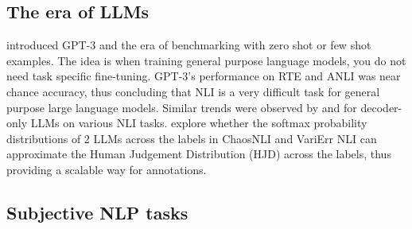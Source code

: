 \subsection{The era of LLMs}
\label{related:llms}
\citet{brown2020language} introduced GPT-3 and the era of benchmarking with zero shot or few shot examples. The idea is when training general purpose language models, you do not need task specific fine-tuning. GPT-3's performance on RTE and ANLI was near chance accuracy, thus concluding that NLI is a very difficult task for general purpose large language models. Similar trends were observed by \citet{ohmer2024form} and \citet{weber-etal-2023-mind} for decoder-only LLMs on various NLI tasks. \citet{chen2024seeingbig} explore whether the softmax probability distributions of 2 LLMs across the labels in ChaosNLI \citep{nie-etal-2020-learn} and VariErr NLI \citep{weber-genzel-etal-2024-varierr} can approximate the Human Judgement Distribution (HJD) across the labels, thus providing a scalable way for annotations.

\subsection{Subjective NLP tasks}
\label{related:subjective}

